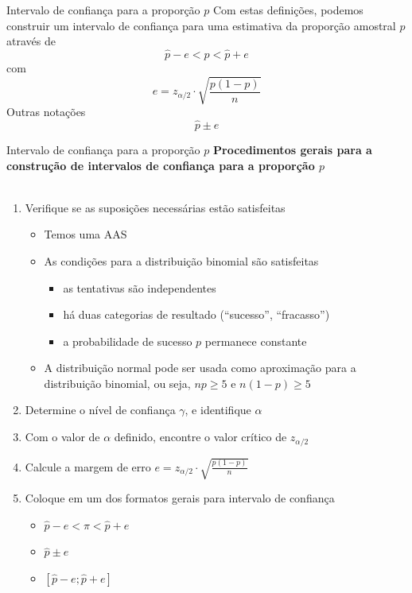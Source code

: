 \documentclass[10pt]{beamer}\usepackage[]{graphicx}\usepackage[]{color}
\theoremstyle{definition}
\begin{document}
\begin{frame}{Intervalo de confiança para a proporção $p$}
  Com estas definições, podemos construir um intervalo de confiança para
  uma estimativa da proporção amostral $p$ através de
  \begin{equation*}
    \hat{p} - e < p < \hat{p} + e
  \end{equation*}
  com
  \begin{equation*}
    e = z_{\alpha/2} \cdot \sqrt{\frac{p(1-p)}{n}}
  \end{equation*}
  Outras notações
  \begin{equation*}
    \hat{p} \pm e
  \end{equation*}
  \begin{equation*}
    [\hat{p} - e; \hat{p} + e]
  \end{equation*}
\end{frame}

\begin{frame}{Intervalo de confiança para a proporção $p$}
  \textbf{Procedimentos gerais para a construção de intervalos de
    confiança para a proporção $p$}
  \\~\\
  \begin{enumerate}
  \item Verifique se as suposições necessárias estão satisfeitas
    \begin{itemize}
    \item Temos uma AAS
    \item As condições para a distribuição binomial são satisfeitas
      \begin{itemize}
      \item as tentativas são independentes
      \item há duas categorias de resultado (``sucesso'', ``fracasso'')
      \item a probabilidade de sucesso $p$ permanece constante
      \end{itemize}
    \item A distribuição normal pode ser usada como aproximação para a
      distribuição binomial, ou seja, $np \geq 5$ e $n(1-p) \geq 5$
    \end{itemize}
  \item Determine o nível de confiança $\gamma$, e identifique $\alpha$
  \item Com o valor de $\alpha$ definido, encontre o valor crítico de
    $z_{\alpha/2}$
  \item Calcule a margem de erro $e = z_{\alpha/2} \cdot
    \sqrt{\frac{p(1-p)}{n}}$
  \item Coloque em um dos formatos gerais para intervalo de confiança
    \begin{itemize}
    \item[] $\hat{p} - e < \pi < \hat{p} + e$
    \item[] $\hat{p} \pm e$
    \item[] $[\hat{p} - e; \hat{p} + e]$
    \end{itemize}
  \end{enumerate}
\end{frame}
\end{document}
